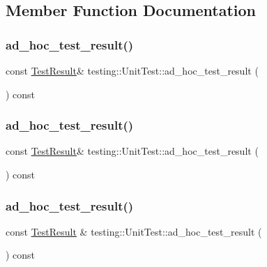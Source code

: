 \subsection{Member Function Documentation}
\mbox{\label{classtesting_1_1_unit_test_afb26f53c070675638033436f35bad889}} 
\subsubsection{\texorpdfstring{ad\_hoc\_test\_result()}{ad\_hoc\_test\_result()}\hspace{0.1cm}{\footnotesize\ttfamily [1/3]}}
{\footnotesize\ttfamily const \mbox{\hyperlink{classtesting_1_1_test_result}{Test\+Result}}\& testing\+::\+Unit\+Test\+::ad\+\_\+hoc\+\_\+test\+\_\+result (\begin{DoxyParamCaption}{ }\end{DoxyParamCaption}) const}

\mbox{\label{classtesting_1_1_unit_test_afb26f53c070675638033436f35bad889}} 
\subsubsection{\texorpdfstring{ad\_hoc\_test\_result()}{ad\_hoc\_test\_result()}\hspace{0.1cm}{\footnotesize\ttfamily [2/3]}}
{\footnotesize\ttfamily const \mbox{\hyperlink{classtesting_1_1_test_result}{Test\+Result}}\& testing\+::\+Unit\+Test\+::ad\+\_\+hoc\+\_\+test\+\_\+result (\begin{DoxyParamCaption}{ }\end{DoxyParamCaption}) const}

\mbox{\label{classtesting_1_1_unit_test_aa59dde4c3dc43a920ed142a27670686c}} 
\subsubsection{\texorpdfstring{ad\_hoc\_test\_result()}{ad\_hoc\_test\_result()}\hspace{0.1cm}{\footnotesize\ttfamily [3/3]}}
{\footnotesize\ttfamily const \mbox{\hyperlink{classtesting_1_1_test_result}{Test\+Result}} \& testing\+::\+Unit\+Test\+::ad\+\_\+hoc\+\_\+test\+\_\+result (\begin{DoxyParamCaption}{ }\end{DoxyParamCaption}) const}

